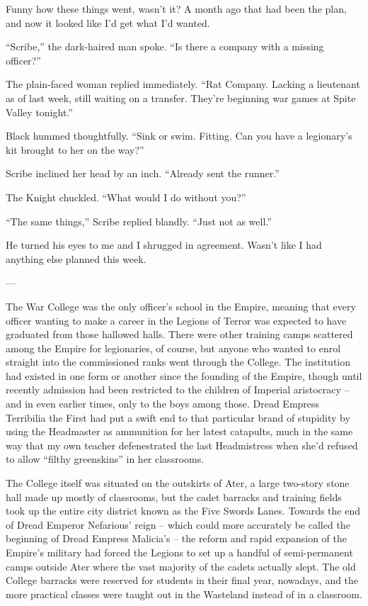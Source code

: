 \documentclass[12pt, openany]{book}
\begin{document}
Funny how these things went, wasn’t it? A month ago that had been the plan, and now it looked like I’d get what I’d wanted.

“Scribe,” the dark-haired man spoke. “Is there a company with a missing officer?”

The plain-faced woman replied immediately. “Rat Company. Lacking a lieutenant as of last week, still waiting on a transfer. They’re beginning war games at Spite Valley tonight.”

Black hummed thoughtfully. “Sink or swim. Fitting. Can you have a legionary’s kit brought to her on the way?”

Scribe inclined her head by an inch. “Already sent the runner.”

The Knight chuckled. “What would I do without you?”

“The same things,” Scribe replied blandly. “Just not as well.”

He turned his eyes to me and I shrugged in agreement. Wasn’t like I had anything else planned this week.

—

The War College was the only officer’s school in the Empire, meaning that every officer wanting to make a career in the Legions of Terror was expected to have graduated from those hallowed halls. There were other training camps scattered among the Empire for legionaries, of course, but anyone who wanted to enrol straight into the commissioned ranks went through the College. The institution had existed in one form or another since the founding of the Empire, though until recently admission had been restricted to the children of Imperial aristocracy – and in even earlier times, only to the boys among those. Dread Empress Terribilia the First had put a swift end to that particular brand of stupidity by using the Headmaster as ammunition for her latest catapults, much in the same way that my own teacher defenestrated the last Headmistress when she’d refused to allow “filthy greenskins” in her classrooms. 

The College itself was situated on the outskirts of Ater, a large two-story stone hall made up mostly of classrooms, but the cadet barracks and training fields took up the entire city district known as the Five Swords Lanes. Towards the end of Dread Emperor Nefarious’ reign – which could more accurately be called the beginning of Dread Empress Malicia’s – the reform and rapid expansion of the Empire’s military had forced the Legions to set up a handful of semi-permanent camps outside Ater where the vast majority of the cadets actually slept. The old College barracks were reserved for students in their final year, nowadays, and the more practical classes were taught out in the Wasteland instead of in a classroom. 
\end{document}
